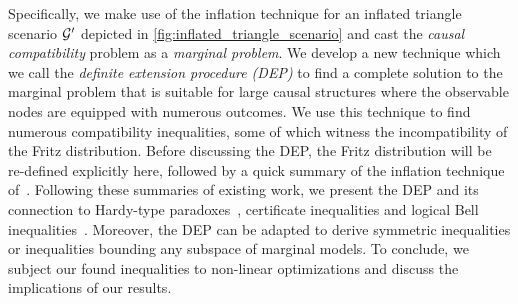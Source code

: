 \documentclass[aps, 10pt, english, twoside, pra, nofootinbib, longbibliography]{revtex4-1}
\begin{document}
    Specifically, we make use of the inflation technique for an inflated triangle scenario ${\mathcal{G}}'$ depicted in \cref{fig:inflated_triangle_scenario} and cast the \textit{causal compatibility} problem as a \textit{marginal problem}. We develop a new technique which we call the \textit{definite extension procedure (DEP)} to find a complete solution to the marginal problem that is suitable for large causal structures where the observable nodes are equipped with numerous outcomes. We use this technique to find numerous compatibility inequalities, some of which witness the incompatibility of the Fritz distribution. Before discussing the DEP, the Fritz distribution will be re-defined explicitly here, followed by a quick summary of the inflation technique of~\cite{Inflation}. Following these summaries of existing work, we present the DEP and its connection to Hardy-type paradoxes~\cite{Inflation,Liang_2011,Mansfield_2012}, certificate inequalities and logical Bell inequalities~\cite{Abramsky_2011}. Moreover, the DEP can be adapted to derive symmetric inequalities or inequalities bounding any subspace of marginal models. To conclude, we subject our found inequalities to non-linear optimizations and discuss the implications of our results.
\end{document}
